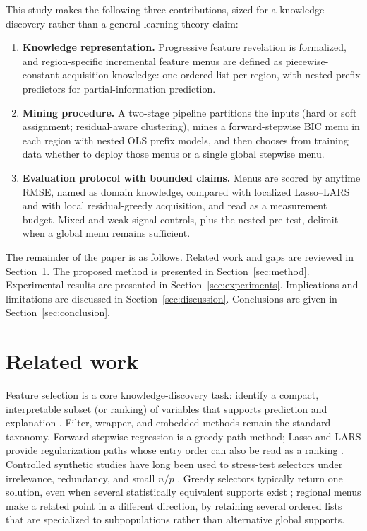 \documentclass[pdflatex,sn-basic,Numbered]{sn-jnl}
\begin{document}
This study makes the following three contributions, sized for a knowledge-discovery rather than a general learning-theory claim:
\begin{enumerate}
  \item \textbf{Knowledge representation.} Progressive feature revelation is formalized, and region-specific incremental feature menus are defined as piecewise-constant acquisition knowledge: one ordered list per region, with nested prefix predictors for partial-information prediction.
  \item \textbf{Mining procedure.} A two-stage pipeline partitions the inputs (hard or soft assignment; residual-aware clustering), mines a forward-stepwise BIC menu in each region with nested OLS prefix models, and then chooses from training data whether to deploy those menus or a single global stepwise menu.
  \item \textbf{Evaluation protocol with bounded claims.} Menus are scored by anytime RMSE, named as domain knowledge, compared with localized Lasso--LARS and with local residual-greedy acquisition, and read as a measurement budget. Mixed and weak-signal controls, plus the nested pre-test, delimit when a global menu remains sufficient.
\end{enumerate}

The remainder of the paper is as follows. Related work and gaps are reviewed in Section~\ref{sec:related}. The proposed method is presented in Section~\ref{sec:method}. Experimental results are presented in Section~\ref{sec:experiments}. Implications and limitations are discussed in Section~\ref{sec:discussion}. Conclusions are given in Section~\ref{sec:conclusion}.

\section{Related work}
\label{sec:related}

Feature selection is a core knowledge-discovery task: identify a compact, interpretable subset (or ranking) of variables that supports prediction and explanation \cite{guyon2003,li2017kais,bolon2013kais}. Filter, wrapper, and embedded methods remain the standard taxonomy. Forward stepwise regression is a greedy path method; Lasso and LARS provide regularization paths whose entry order can also be read as a ranking \cite{tibshirani1996,efron2004}. Controlled synthetic studies have long been used to stress-test selectors under irrelevance, redundancy, and small \(n/p\) \cite{bolon2013kais}. Greedy selectors typically return one solution, even when several statistically equivalent supports exist \cite{borboudakis2021}; regional menus make a related point in a different direction, by retaining several ordered lists that are specialized to subpopulations rather than alternative global supports.
\end{document}

